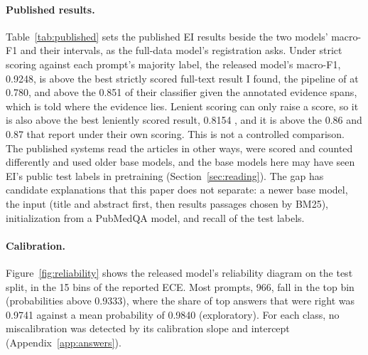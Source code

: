 \documentclass[11pt,letterpaper]{article}
\begin{document}
\paragraph{Published results.} Table~\ref{tab:published} sets the published EI results beside the two models' macro-F1 and their intervals, as the full-data model's registration asks. Under strict scoring against each prompt's majority label, the released model's macro-F1, 0.9248, is above the best strictly scored full-text result I found, the pipeline of \citet{deyoung2020} at 0.780, and above the 0.851 of their classifier given the annotated evidence spans, which is told where the evidence lies. Lenient scoring can only raise a score, so it is also above the best leniently scored result, 0.8154 \citep{buchmann2024structure}, and it is above the 0.86 and 0.87 that \citet{buchmann2024lab} report under their own scoring. This is not a controlled comparison. The published systems read the articles in other ways, were scored and counted differently and used older base models, and the base models here may have seen EI's public test labels in pretraining (Section~\ref{sec:reading}). The gap has candidate explanations that this paper does not separate: a newer base model, the input (title and abstract first, then results passages chosen by BM25), initialization from a PubMedQA model, and recall of the test labels.

\begin{table}[t]
\centering\footnotesize
\caption{Published results on Evidence Inference 2.0's test split beside the two models' macro-F1. The published values are the papers' own; those systems read the articles in other ways and were scored and counted differently, so this is not a controlled comparison. The full-data model's figure is scored as each paper scored (strict, or lenient as \citet{buchmann2024structure} scored); the released model's is strict, since its analyses did not compute the lenient score, which can only raise it. Each interval is a 95 percent interval from 1,000 article resamples. LED is the Longformer Encoder-Decoder.}
\label{tab:published}
\setlength{\tabcolsep}{4.5pt}

\end{table}

\paragraph{Calibration.} Figure~\ref{fig:reliability} shows the released model's reliability diagram on the test split, in the 15 bins of the reported ECE. Most prompts, 966, fall in the top bin (probabilities above 0.9333), where the share of top answers that were right was 0.9741 against a mean probability of 0.9840 (exploratory). For each class, no miscalibration was detected by its calibration slope and intercept (Appendix~\ref{app:answers}).
\end{document}
